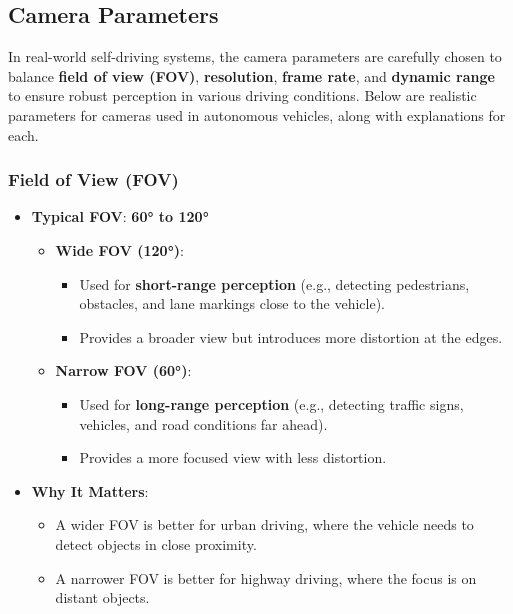 \subsection{Camera Parameters}
In real-world self-driving systems, the camera parameters are carefully chosen to balance \textbf{field of view (FOV)}, \textbf{resolution}, \textbf{frame rate}, and \textbf{dynamic range} to ensure robust perception in various driving conditions. Below are realistic parameters for cameras used in autonomous vehicles, along with explanations for each.

\subsubsection{Field of View (FOV)}
\begin{itemize}
    \item \textbf{Typical FOV}: \textbf{60° to 120°}
    \begin{itemize}
        \item \textbf{Wide FOV (120°)}:
        \begin{itemize}
            \item Used for \textbf{short-range perception} (e.g., detecting pedestrians, obstacles, and lane markings close to the vehicle).
            \item Provides a broader view but introduces more distortion at the edges.
        \end{itemize}
        \item \textbf{Narrow FOV (60°)}:
        \begin{itemize}
            \item Used for \textbf{long-range perception} (e.g., detecting traffic signs, vehicles, and road conditions far ahead).
            \item Provides a more focused view with less distortion.
        \end{itemize}
    \end{itemize}
    \item \textbf{Why It Matters}:
    \begin{itemize}
        \item A wider FOV is better for urban driving, where the vehicle needs to detect objects in close proximity.
        \item A narrower FOV is better for highway driving, where the focus is on distant objects.
    \end{itemize}
\end{itemize}

